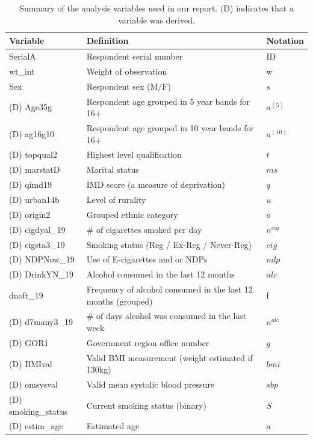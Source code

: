 \documentclass[
  11pt,
  twocolumn]{article}
\begin{document}
\begin{table}
\centering
\caption{\label{tab:outputvartable}Summary of the analysis variables used in our report. (D) indicates that a variable was derived.\label{tab:output-var-table}}
\centering
\fontsize{8}{10}\selectfont
\begin{tabular}[t]{>{\raggedright\arraybackslash}p{7em}|>{\raggedright\arraybackslash}p{11em}|l}
\hline
\textbf{Variable} & \textbf{Definition} & \textbf{Notation}\\
\hline
SerialA & Respondent serial number & ID\\
\hline
wt\_int & Weight of observation & w\\
\hline
Sex & Respondent sex (M/F) & $s$\\
\hline
(D) Age35g & Respondent age grouped in 5 year bands for 16+ & $a^{(5)}$\\
\hline
(D) ag16g10 & Respondent age grouped in 10 year bands for 16+ & $a^{(10)}$\\
\hline
(D) topqual2 & Highest level qualification & $t$\\
\hline
(D) marstatD & Marital status & $ms$\\
\hline
(D) qimd19 & IMD score (a measure of deprivation) & $q$\\
\hline
(D) urban14b & Level of rurality & $u$\\
\hline
(D) origin2 & Grouped ethnic category & $o$\\
\hline
(D) cigdyal\_19 & $\#$ of cigarettes smoked per day & $n^{cig}$\\
\hline
(D) cigsta3\_19 & Smoking status (Reg / Ex-Reg / Never-Reg) & $cig$\\
\hline
(D) NDPNow\_19 & Use of E-cigarettes and or NDPs & $ndp$\\
\hline
(D) DrinkYN\_19 & Alcohol consumed in the last 12 months & $alc$\\
\hline
dnoft\_19 & Frequency of alcohol consumed in the last 12 months (grouped) & f\\
\hline
(D) d7many3\_19 & $\#$ of days alcohol was consumed in the last week & $n^{alc}$\\
\hline
(D) GOR1 & Government region office number & $g$\\
\hline
(D) BMIval & Valid BMI measurement (weight estimated if $\>$ 130kg) & $bmi$\\
\hline
(D) omsysval & Valid mean systolic blood pressure & $sbp$\\
\hline
(D) smoking\_status & Current smoking status (binary) & $S$\\
\hline
(D) estim\_age & Estimated age & $a$\\
\hline
\end{tabular}
\end{table}
\end{document}
